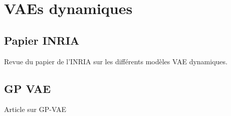 \section{VAEs dynamiques}

\subsection{Papier INRIA}

Revue du papier de l'INRIA sur les différents modèles VAE dynamiques.

\subsection{GP VAE}

Article sur GP-VAE